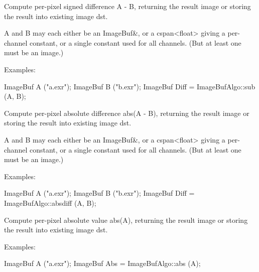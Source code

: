 Compute per-pixel signed difference {\cf A - B}, returning the result image
or storing the result into existing image {\cf dst}.

{\cf A} and {\cf B} may each either be an {\cf ImageBuf\&}, or a
{\cf cspan<float>} giving a per-channel constant, or a single constant used
for all channels. (But at least one must be an image.)

\smallskip
\noindent Examples:
\begin{code}
    ImageBuf A ("a.exr");
    ImageBuf B ("b.exr");
    ImageBuf Diff = ImageBufAlgo::sub (A, B);
\end{code}
\apiend


 

Compute per-pixel absolute difference {\cf abs(A - B)}, returning the result image
or storing the result into existing image {\cf dst}.

{\cf A} and {\cf B} may each either be an {\cf ImageBuf\&}, or a
{\cf cspan<float>} giving a per-channel constant, or a single constant used
for all channels. (But at least one must be an image.)

\smallskip
\noindent Examples:
\begin{code}
    ImageBuf A ("a.exr");
    ImageBuf B ("b.exr");
    ImageBuf Diff = ImageBufAlgo::absdiff (A, B);
\end{code}
\apiend


 

Compute per-pixel absolute value {\cf abs(A)}, returning the result image
or storing the result into existing image {\cf dst}.

\smallskip
\noindent Examples:
\begin{code}
    ImageBuf A ("a.exr");
    ImageBuf Abs = ImageBufAlgo::abs (A);
\end{code}
\apiend



 

